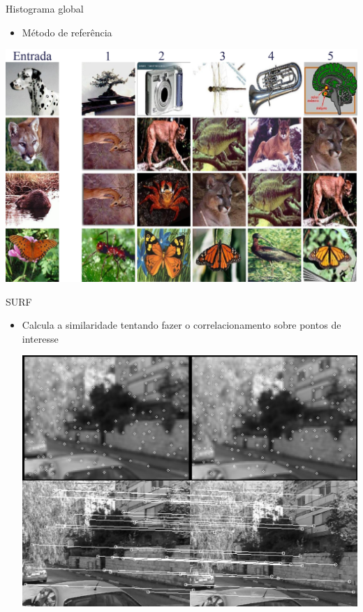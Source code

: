 \documentclass[
    style=paintings,
    paper=screen,
    blackslide,
    nopagebreaks,
    fleqn
]{powerdot}
\begin{document}
\begin{slide}{Histograma global}
\begin{itemize}[type=1]
\item <1-> Método de referência
\end{itemize}
\begin{center}
\includegraphics[width=0.65\slidewidth]{img/histograma_global}
\end{center}
\end{slide}


\begin{slide}{SURF}
\begin{itemize}[type=1]
\item <1-> Calcula a similaridade tentando fazer o correlacionamento sobre pontos de interesse
\begin{center}
\includegraphics[width=0.65\slidewidth]{img/surf}
\end{center}
\end{itemize}
\end{slide}
\end{document}
